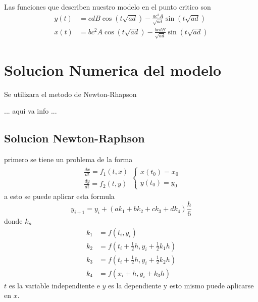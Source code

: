 \documentclass{report}
\begin{document}
Las funciones que describen nuestro modelo en el punto critico son
\begin{align*}
y(t)&=cdB\cos(t\sqrt{ad})
-\frac{ac^2A}{\sqrt{ad}}\sin(t\sqrt{ad}) \\
x(t)&=bc^2A\cos(t\sqrt{ad})-\frac{bcdB}{\sqrt{ad}}\sin(t\sqrt{ad})
\end{align*}

\chapter{Solucion Numerica del modelo}
Se utilizara el metodo de Newton-Rhapson

...
aqui va info
...
\section{Solucion Newton-Raphson}
primero se tiene un problema de la forma 
\begin{align*}
\begin{array}{c}
\frac{dx}{dt}=f_1(t,x) \\
\frac{dy}{dt}=f_2(t,y) 
\end{array}
\begin{cases}
x(t_0)=x_0\\
y(t_0)=y_0
\end{cases}
\end{align*}
a esto se puede aplicar esta formula
\begin{equation}
y_{i+1}=y_i+(ak_1+bk_2+ck_3+dk_4)\frac{h}{6}
\end{equation}
donde $k_n$
\begin{align*}
k_1&=f(t_i,y_i) \\
k_2&=f\left(t_i+\frac{1}{2}h, y_i+\frac{1}{2}k_1h\right)\\
k_3&=f\left(t_i+\frac{1}{2}h,y_i+\frac{1}{2}k_2h\right) \\
k_4&=f\left(x_i+h,y_i+k_3h\right)
\end{align*}
$t$ es la variable independiente e $y$ es la dependiente y esto mismo puede aplicarse en $x$.
\end{document}
